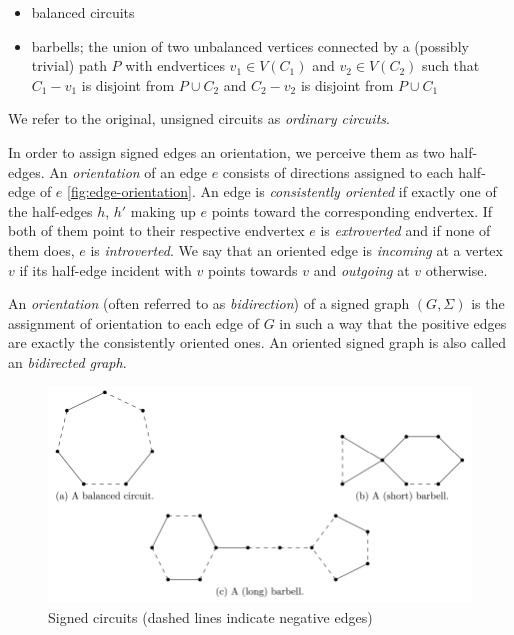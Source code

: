 \begin{itemize}
    \item balanced circuits
    \item barbells; the union of two unbalanced vertices connected by a (possibly trivial) path $P$ with endvertices $v_1 \in V(C_1)$ and $v_2 \in V(C_2)$ such that $C_1 - v_1$ is disjoint from $P \cup C_2$ and $C_2 - v_2$ is disjoint from $P \cup C_1$
\end{itemize}

We refer to the original, unsigned circuits as \textit{ordinary circuits}.

In order to assign signed edges an orientation, we perceive them as two half-edges.
An \textit{orientation} of an edge $e$ consists of directions assigned to each half-edge of $e$ \cref{fig:edge-orientation}.
An edge is \textit{consistently oriented} if exactly one of the half-edges $h$, $h'$ making up $e$ points toward the corresponding endvertex.
If both of them point to their respective endvertex $e$ is \textit{extroverted} and if none of them does, $e$ is \textit{introverted}.
We say that an oriented edge is \textit{incoming} at a vertex $v$ if its half-edge incident with $v$ points towards $v$ and \textit{outgoing} at $v$ otherwise.

An \textit{orientation} (often referred to as \textit{bidirection}) of a signed graph $(G, \Sigma)$ is the assignment of orientation to each edge of $G$ in such a way that the positive edges
are exactly the consistently oriented ones. An oriented signed graph is also called an \textit{bidirected graph}.

\begin{figure}[ht]\label{fig:signed-circuits}
    \centering
    \includegraphics[scale=0.65]{images/signed-circuits.png}
    \caption{Signed circuits (dashed lines indicate negative edges)}
\end{figure}

